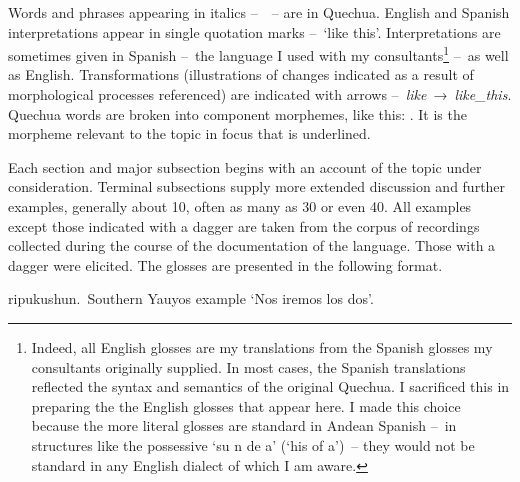 Words and phrases appearing in italics --~~-- are in Quechua. English and Spanish interpretations appear in single quotation marks --~‘like this’. Interpretations are sometimes given in Spanish --~the language I used with my consultants\footnote{Indeed, all English glosses are my translations from the Spanish glosses my consultants originally supplied. In most cases, the Spanish translations reflected the syntax and semantics of the original Quechua. I sacrificed this in preparing the the English glosses that appear here. I made this choice because the more literal glosses are standard in Andean Spanish --~in structures like the possessive ‘su n de a’ (‘his  of a’)~-- they would not be standard in any English dialect of which I am aware.} --~as well as English. Transformations (illustrations of changes indicated as a result of morphological processes referenced) are indicated with arrows --~\textit{like}~→~\textit{like\_this}. Quechua words are broken into component morphemes, like this: . It is the morpheme relevant to the topic in focus that is underlined. 

Each section and major subsection begins with an account of the topic under consideration. Terminal subsections supply more extended discussion and further examples, generally about 10, often as many as 30 or even 40. All examples except those indicated with a dagger are taken from the corpus of recordings collected during the course of the documentation of the language. Those with a dagger were elicited. The glosses are presented in the following format.\\[1ex]

\begin{footnotesize}
\gloexe{}{}{}%
{ ripukushun.~\textup{\AMV}\hspace{29.5ex}Southern Yauyos example}%
{\hspace{23ex}}%
%
{‘Nos iremos los dos’.}%
{}{}%
\end{footnotesize}

